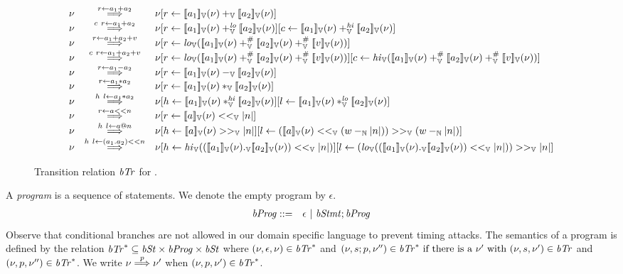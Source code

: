 \begin{figure*}
\[
\begin{array}{rcl}
\bvst & \goesto{r \leftarrow a_1 + a_2} & \bvst[r \leftarrow \bvvalueof{a_1}(\bvst) +_\bvop \bvvalueof{a_2}(\bvst)] \\
\bvst & \goesto{c\ r \leftarrow a_1 + a_2} & \bvst[r \leftarrow \bvvalueof{a_1}(\bvst) +_\bvop^\lo \bvvalueof{a_2}(\bvst)][c \leftarrow \bvvalueof{a_1}(\bvst) +_\bvop^\hi \bvvalueof{a_2}(\bvst)] \\
\bvst & \goesto{r \leftarrow a_1 + a_2 + v} & \bvst[r \leftarrow \lo_\bvop(\bvvalueof{a_1}(\bvst) +_\bvop^\# \bvvalueof{a_2}(\bvst) +_\bvop^\# \bvvalueof{v}(\bvst))] \\
\bvst & \goesto{c\ r \leftarrow a_1 + a_2 + v} & \bvst[r \leftarrow \lo_\bvop(\bvvalueof{a_1}(\bvst) +_\bvop^\# \bvvalueof{a_2}(\bvst) +_\bvop^\# \bvvalueof{v}(\bvst))][c \leftarrow \hi_\bvop(\bvvalueof{a_1}(\bvst) +_\bvop^\# \bvvalueof{a_2}(\bvst) +_\bvop^\# \bvvalueof{v}(\bvst))] \\
\bvst & \goesto{r \leftarrow a_1 - a_2} & \bvst[r \leftarrow \bvvalueof{a_1}(\bvst) -_\bvop \bvvalueof{a_2}(\bvst)] \\
\bvst & \goesto{r \leftarrow a_1 * a_2} & \bvst[r \leftarrow \bvvalueof{a_1}(\bvst) *_\bvop \bvvalueof{a_2}(\bvst)] \\
\bvst & \goesto{h\ l \leftarrow a_1 * a_2} & \bvst[h \leftarrow \bvvalueof{a_1}(\bvst) *_\bvop^\hi \bvvalueof{a_2}(\bvst)][l \leftarrow \bvvalueof{a_1}(\bvst) *_\bvop^\lo \bvvalueof{a_2}(\bvst)] \\
\bvst & \goesto{r \leftarrow a << n} & \bvst[r \leftarrow \bvvalueof{a}(\bvst) <<_\bvop \unsigned{n}] \\
\bvst & \goesto{h\ l \leftarrow a @ n} & \bvst[h \leftarrow \bvvalueof{a}(\bvst) >>_\bvop \unsigned{n}][l \leftarrow (\bvvalueof{a}(\bvst) <<_\bvop (w -_{\bbfN} \unsigned{n}))  >>_\bvop (w -_{\bbfN} \unsigned{n})] \\
\bvst & \goesto{h\ l \leftarrow (a_1 . a_2) << n} & \bvst[h \leftarrow \hi_\bvop((\bvvalueof{a_1}(\bvst) ._\bvop \bvvalueof{a_2}(\bvst)) <<_\bvop \unsigned{n})][l \leftarrow (\lo_\bvop((\bvvalueof{a_1}(\bvst) ._\bvop \bvvalueof{a_2}(\bvst)) <<_\bvop \unsigned{n})) >>_\bvop \unsigned{n}] \\
\end{array}
\]
\caption{Transition relation $\mathit{bTr}$ for \bvdsl. \label{fig:semantic-function-bvdsl}}
\end{figure*}

A \emph{program} is a sequence of statements.
We denote the empty program by $\epsilon$.
\begin{eqnarray*}
  \mathit{bProg} & ::= & \epsilon \ |\ \mathit{bStmt}; \mathit{bProg}
\end{eqnarray*}
Observe that conditional branches are not allowed in our domain specific language to prevent timing attacks.
The semantics of a program is defined by the relation
$\mathit{bTr}^* \subseteq \mathit{bSt} \times \mathit{bProg} \times \mathit{bSt}$ where
$(\nu, \epsilon, \nu) \in \mathit{bTr}^*$ and
$(\nu, s; p, \nu'') \in \mathit{bTr}^* \textmd{ if }
    \textmd{there is a } \nu' \textmd{ with }
    (\nu, s, \nu') \in \mathit{bTr}$ and
    $(\nu, p, \nu'') \in \mathit{bTr}^*$.
We write $\nu \overset{p}{\Longrightarrow} \nu'$ when $(\nu, p, \nu') \in \mathit{bTr}^*$.

